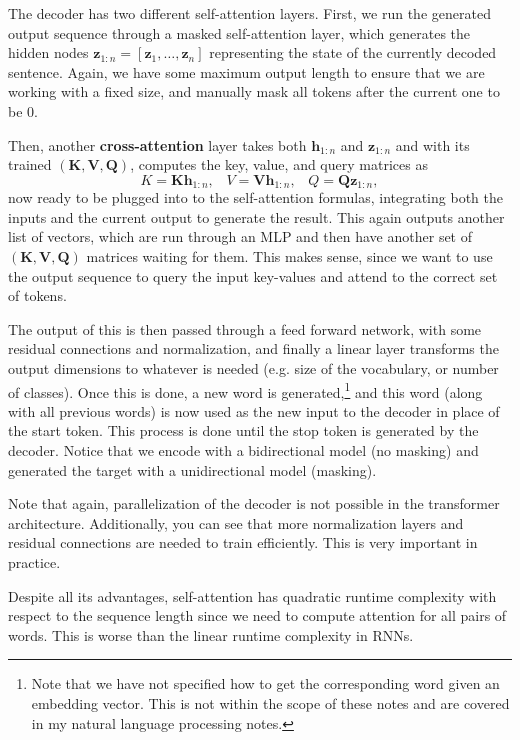     The decoder has two different self-attention layers. First, we run the generated output sequence through a masked self-attention layer, which generates the hidden nodes $\mathbf{z}_{1:n} = [\mathbf{z}_1, \ldots, \mathbf{z}_n]$ representing the state of the currently decoded sentence. Again, we have some maximum output length to ensure that we are working with a fixed size, and manually mask all tokens after the current one to be $0$.

    Then, another \textbf{cross-attention} layer takes both $\mathbf{h}_{1:n}$ and $\mathbf{z}_{1:n}$ and with its trained $(\mathbf{K}, \mathbf{V}, \mathbf{Q})$, computes the key, value, and query matrices as 
    \begin{equation}
      K = \mathbf{K} \mathbf{h}_{1:n}, \;\;\; V = \mathbf{V} \mathbf{h}_{1:n}, \;\;\; Q = \mathbf{Q} \mathbf{z}_{1:n}, 
    \end{equation}
    now ready to be plugged into to the self-attention formulas, integrating both the inputs and the current output to generate the result. This again outputs another list of vectors, which are run through an MLP and then have another set of $(\mathbf{K}, \mathbf{V}, \mathbf{Q})$ matrices waiting for them. This makes sense, since we want to use the output sequence to query the input key-values and attend to the correct set of tokens. 
    
    The output of this is then passed through a feed forward network, with some residual connections and normalization, and finally a linear layer transforms the output dimensions to whatever is needed (e.g. size of the vocabulary, or number of classes). Once this is done, a new word is generated,\footnote{Note that we have not specified how to get the corresponding word given an embedding vector. This is not within the scope of these notes and are covered in my natural language processing notes.} and this word (along with all previous words) is now used as the new input to the decoder in place of the start token. This process is done until the stop token is generated by the decoder. Notice that we encode with a bidirectional model (no masking) and generated the target with a unidirectional model (masking). 

    Note that again, parallelization of the decoder is not possible in the transformer architecture. Additionally, you can see that more normalization layers and residual connections are needed to train efficiently. This is very important in practice. 

    Despite all its advantages, self-attention has quadratic runtime complexity with respect to the sequence length since we need to compute attention for all pairs of words. This is worse than the linear runtime complexity in RNNs.  

